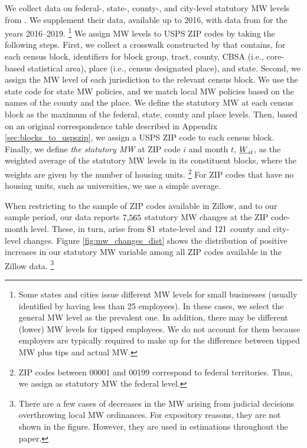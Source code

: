 We collect data on federal-, state-, county-, and city-level statutory MW levels 
from \textcite{VaghulZipperer2016}.
We supplement their data, available up to 2016, with data from 
\textcite{BerkeleyLaborCenter} for the years 2016--2019.%
\footnote{Some states and cities issue different MW levels for small businesses
(usually identified by having less than 25 employees).
In these cases, we select the general MW level as the prevalent one.
In addition, there may be different (lower) MW levels for tipped employees.
We do not account for them because employers are typically required to make up 
for the difference between tipped MW plus tips and actual MW.}
We assign MW levels to USPS ZIP codes by taking the following steps.
First, we collect a crosswalk constructed by \parencite{CensusLODES} that contains,
for each census block, identifiers for block group, tract, county, CBSA 
(i.e., core-based statistical area), place (i.e., census designated place), and state.
Second, we assign the MW level of each jurisdiction to the relevant census block.
We use the state code for state MW policies, and we match local MW policies 
based on the names of the county and the place.
We define the statutory MW at each census block as the maximum of the federal,
state, county and place levels.
Then, based on an original correspondence table described in Appendix 
\ref{sec:blocks_to_uspszip}, we assign a USPS ZIP code to each census
block.
Finally, we define \textit{the statutory MW} at ZIP code $i$ and month $t$, $\underline{W}_{it}$, 
as the weighted average of the statutory MW levels in its constituent blocks, 
where the weights are given by the number of housing units.%
\footnote{ZIP codes between 00001 and 00199 correspond to federal territories.
Thus, we assign as statutory MW the federal level.}
For ZIP codes that have no housing units, such as universities,
we use a simple average.

When restricting 
to the sample of ZIP codes available in Zillow, and 
to our sample period, our data reports 
$\textnormal{7,565}$ statutory MW changes at the ZIP code-month level.
These, in turn, arise from 
$\textnormal{81}$ state-level and 
$\textnormal{121}$ county and city-level changes.
Figure \ref{fig:mw_changes_dist} shows the distribution of positive increases in
our statutory MW variable among all ZIP codes available in the Zillow data.%
\footnote{There are a few cases of decreases in the MW arising from judicial 
decisions overthrowing local MW ordinances.
For expository reasons, they are not shown in the figure.
However, they are used in estimations throughout the paper.}

